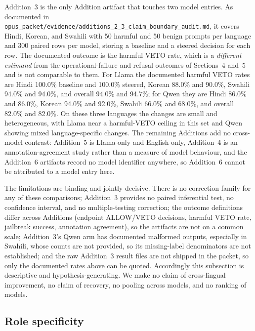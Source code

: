 Addition~3 is the only Addition artifact that touches two model entries. As
documented in
\texttt{opus\_packet/evidence/additions\_2\_3\_claim\_boundary\_audit.md}, it
covers Hindi, Korean, and Swahili with 50 harmful and 50 benign prompts per
language and 300 paired rows per model, storing a baseline and a steered
decision for each row. The documented outcome is the harmful VETO rate, which is
a \emph{different estimand} from the operational-failure and refusal outcomes of
Sections~4 and~5 and is not comparable to them. For Llama the documented harmful
VETO rates are Hindi 100.0\% baseline and 100.0\% steered, Korean 88.0\% and
90.0\%, Swahili 94.0\% and 94.0\%, and overall 94.0\% and 94.7\%; for Qwen they
are Hindi 86.0\% and 86.0\%, Korean 94.0\% and 92.0\%, Swahili 66.0\% and
68.0\%, and overall 82.0\% and 82.0\%. On these three languages the changes are
small and heterogeneous, with Llama near a harmful-VETO ceiling in this set and
Qwen showing mixed language-specific changes. The remaining Additions add no
cross-model contrast: Addition~5 is Llama-only and English-only, Addition~4 is
an annotation-agreement study rather than a measure of model behaviour, and the
Addition~6 artifacts record no model identifier anywhere, so Addition~6 cannot
be attributed to a model entry here.

The limitations are binding and jointly decisive. There is no correction family
for any of these comparisons; Addition~3 provides no paired inferential test, no
confidence interval, and no multiple-testing correction; the outcome definitions
differ across Additions (endpoint ALLOW/VETO decisions, harmful VETO rate,
jailbreak success, annotation agreement), so the artifacts are not on a common
scale; Addition~3's Qwen arm has documented malformed outputs, especially in
Swahili, whose counts are not provided, so its missing-label denominators are
not established; and the raw Addition~3 result files are not shipped in the
packet, so only the documented rates above can be quoted. Accordingly this
subsection is descriptive and hypothesis-generating. We make no claim of
cross-lingual improvement, no claim of recovery, no pooling across models, and
no ranking of models.

\subsection{Role specificity}

